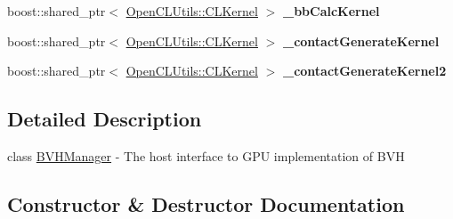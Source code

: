 \begin{DoxyCompactItemize}
\item 
boost\+::shared\+\_\+ptr$<$ \hyperlink{class_c_l_ray_tracer_1_1_open_c_l_utils_1_1_c_l_kernel}{Open\+C\+L\+Utils\+::\+C\+L\+Kernel} $>$ {\bfseries \+\_\+bb\+Calc\+Kernel}\hypertarget{class_c_l_ray_tracer_1_1_acceleration_structures_1_1_b_v_h_manager_a0f8da82584c796cda7c3d29cca9df485}{}\label{class_c_l_ray_tracer_1_1_acceleration_structures_1_1_b_v_h_manager_a0f8da82584c796cda7c3d29cca9df485}

\item 
boost\+::shared\+\_\+ptr$<$ \hyperlink{class_c_l_ray_tracer_1_1_open_c_l_utils_1_1_c_l_kernel}{Open\+C\+L\+Utils\+::\+C\+L\+Kernel} $>$ {\bfseries \+\_\+contact\+Generate\+Kernel}\hypertarget{class_c_l_ray_tracer_1_1_acceleration_structures_1_1_b_v_h_manager_a0171f2a54bc88e68feb34d0a09548462}{}\label{class_c_l_ray_tracer_1_1_acceleration_structures_1_1_b_v_h_manager_a0171f2a54bc88e68feb34d0a09548462}

\item 
boost\+::shared\+\_\+ptr$<$ \hyperlink{class_c_l_ray_tracer_1_1_open_c_l_utils_1_1_c_l_kernel}{Open\+C\+L\+Utils\+::\+C\+L\+Kernel} $>$ {\bfseries \+\_\+contact\+Generate\+Kernel2}\hypertarget{class_c_l_ray_tracer_1_1_acceleration_structures_1_1_b_v_h_manager_aac462ea62721df4ac8266cc5ca24353d}{}\label{class_c_l_ray_tracer_1_1_acceleration_structures_1_1_b_v_h_manager_aac462ea62721df4ac8266cc5ca24353d}

\end{DoxyCompactItemize}


\subsection{Detailed Description}
class \hyperlink{class_c_l_ray_tracer_1_1_acceleration_structures_1_1_b_v_h_manager}{B\+V\+H\+Manager} -\/ The host interface to G\+PU implementation of B\+VH 

\subsection{Constructor \& Destructor Documentation}
